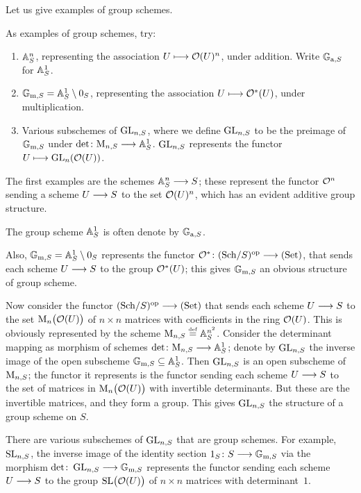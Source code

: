 \begin{2   CONTRAVARIANT FUNCTORS}
\begin{2.2 Group objects}
Let us give examples of group schemes.
\begin{shaded}
As examples of group schemes, try:
\begin{enumerate}\squishlist
\item  $\AA^n_S$, representing the association $U\mapsto \calO(U)^n$, under addition. Write $\GG_{\rma, S}$ for $\AA^1_S$.
\item  $\gm = \AA_S^1 \setminus 0_S$, representing the association $U\mapsto \calO^*(U)$, under multiplication.
\item Various subschemes of $\GL_{n,S}$, where we define $\GL_{n,S}$ to be the preimage of $\gm$ under $\det \colon \M_{n,S} \arr \AA_S^1$. $\GL_{n,S}$ represents the functor $U\mapsto \GL_{n}(\calO(U))$.
\end{enumerate}

\end{shaded}
The first examples are the schemes $\AA^n_S \arr S$; these represent the functor $\cO^n $ sending a scheme $U \arr S$ to the set $\cO(U)^n$, which has an evident additive group structure. 

The group scheme $\AA^1_S$ is often denote by $\GG_{\rma, S}$.

Also, $\gm = \AA_S^1 \setminus 0_S$ represents the functor $\cO^*\colon \catsch{S}\op \arr \catset$, that sends each scheme $U \arr S$ to the group $\cO^*(U)$; this gives $\gm$ an obvious structure of group scheme.

Now consider the functor $\catsch{S}\op \arr \catset$ that sends each scheme $U \arr S$ to the set $\M_n\bigl(\cO(U)\bigr)$ of $n \times n$ matrices with coefficients in the ring $\cO(U)$. This is obviously represented by the scheme $\M_{n,S} \eqdef \AA_S^{n^2}$. Consider the determinant mapping as morphism of schemes $\det \colon \M_{n,S} \arr \AA_S^1$; denote by $\GL_{n,S}$ the inverse image of the open subscheme $\gm \subseteq \AA_{S}^1$. Then $\GL_{n,S}$ is an open subscheme of $\M_{n,S}$; the functor it represents is the functor sending each scheme $U \arr S$ to the set of matrices in $\M_n\bigl(\cO(U)\bigr)$ with invertible determinants. But these are the invertible matrices, and they form a group. This gives $\GL_{n,S}$ the structure of a group scheme on $S$.

There are various subschemes of $\GL_{n,S}$ that are group schemes. For example, $\SL_{n,S}$, the inverse image of the identity section $1_S \colon S \arr \gm$ via the morphism $\det \colon \GL_{n,S} \arr \gm$ represents the functor sending each scheme $U \arr S$ to the group $\SL \bigl(\cO(U)\bigr)$ of $n \times n$ matrices with determinant~$1$.


\end{2.2 Group objects}
\end{2   CONTRAVARIANT FUNCTORS}
